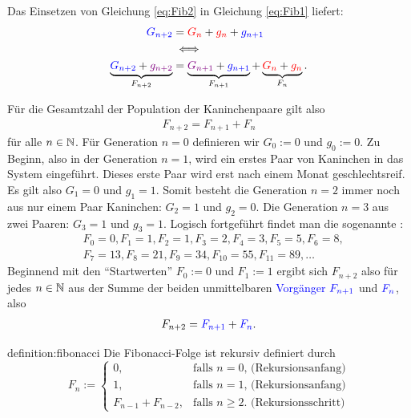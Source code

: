 \noindent
Das Einsetzen von Gleichung \ref{eq:Fib2} in Gleichung \ref{eq:Fib1} liefert:
\begin{align*}
    \textcolor{Blue}{G_{n+2}} &= \textcolor{Red}{G_{n}} + \textcolor{Red}{g_{n}} + \textcolor{Blue}{g_{n+1}} \\
    &\iff \\
    \underbrace{\textcolor{Blue}{G_{n+2}} + \textcolor{Purple}{g_{n+2}}}_{F_{n+2}} &= \underbrace{\textcolor{Purple}{G_{n+1}} + \textcolor{Blue}{g_{n+1}}}_{F_{n+1}} + \underbrace{\textcolor{Red}{G_{n}} + \textcolor{Red}{g_{n}}}_{F_n}.
\end{align*}

\noindent
Für die Gesamtzahl der Population der Kaninchenpaare gilt also
\begin{align*}
    F_{n+2} = F_{n+1} + F_{n}
\end{align*}
für alle $n\in\mathbb{N}$. Für Generation $n=0$ definieren wir $G_0:=0$ und $g_0:=0$. Zu Beginn, also in der Generation $n=1$, wird ein erstes Paar von Kaninchen in das System eingeführt. Dieses erste Paar wird erst nach einem Monat geschlechtsreif. Es gilt also $G_1=0$ und $g_1=1$. Somit besteht die Generation $n=2$ immer noch aus nur einem Paar Kaninchen: $G_2=1$ und $g_2=0$. Die Generation $n=3$ aus zwei Paaren: $G_3=1$ und $g_3=1$. Logisch fortgeführt findet man die sogenannte :
\begin{align*}
    &F_0 = 0, F_1 = 1, F_2 = 1, F_3 = 2, F_4 = 3, F_5 = 5, F_6 = 8,\\
    &F_7 = 13, F_8 = 21, F_9 = 34, F_{10} = 55, F_{11} = 89, \ldots
\end{align*}
Beginnend mit den \enquote{Startwerten} $F_0 := 0$ und  $F_1 := 1$ ergibt sich $F_{n+2}$ also für jedes $n\in\mathbb{N}$ aus der Summe der beiden unmittelbaren \textcolor{Blue}{Vorgänger} $\textcolor{Blue}{F_{n+1}}$ und $\textcolor{Blue}{F_{n}}$, also
\begin{align*}
    F_{n+2} = \textcolor{Blue}{F_{n+1}} + \textcolor{Blue}{F_{n}}.
\end{align*}
\begin{definition}{definition:fibonacci}
Die Fibonacci-Folge ist rekursiv definiert durch
\[
  F_n := 
  \begin{cases}
    0, &\text{falls $n=0$, (Rekursionsanfang)} \\
    1, &\text{falls $n=1$, (Rekursionsanfang)} \\
    F_{n-1} + F_{n-2}, & \text{falls  $n\geq 2$. (Rekursionsschritt)}
  \end{cases}
\]
\end{definition}
